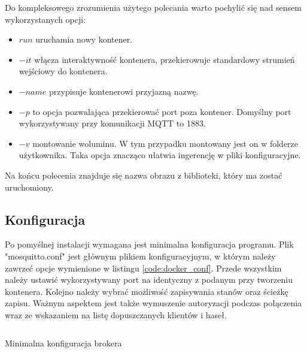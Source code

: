             Do kompleksowego zrozumienia użytego polecania warto pochylić się nad sensem wykorzystanych opcji:
            
            \begin{itemize}
                \item $run$ uruchamia nowy kontener.
                
                \item $-it$ włącza interaktywność kontenera, przekierowuje standardowy strumień wejściowy do kontenera.
                
                \item $-name$ przypisuje kontenerowi przyjazną nazwę.
                
                \item $-p$ to opcja pozwalająca przekierować port poza kontener. Domyślny port wykorzystywany przy komunikacji MQTT to 1883.
                
                \item $-v$ montowanie woluminu. W tym przypadku montowany jest on w folderze użytkownika. Taka opcja znacząco ułatwia ingerencję w pliki konfiguracyjne.
                
            \end{itemize}
            
            Na końcu polecenia znajduje się nazwa obrazu z biblioteki, który ma zostać uruchomiony.
        
        \subsection{Konfiguracja}
            Po pomyślnej instalacji wymagana jest minimalna konfiguracja programu. Plik "mosquitto.conf" jest głównym plikiem konfiguracyjnym, w którym należy zawrzeć opcje wymienione w listingu \ref{code:docker_conf}. Przede wszystkim należy ustawić wykorzystywany port na identyczny z podanym przy tworzeniu kontenera. Kolejno należy wybrać możliwość zapisywania stanów oraz ścieżkę zapisu. Ważnym aspektem jest także wymuszenie autoryzacji podczas połączenia wraz ze wskazaniem na listę dopuszczanych klientów i haseł.
            
            \begin{kod}
                \inputminted[firstline=7, lastline=11]{sh}{mqtt/listings/docker.sh}
                \caption{Minimalna konfiguracja brokera}
                \label{code:docker_conf}
                \vspace{2em}
            \end{kod}
            
